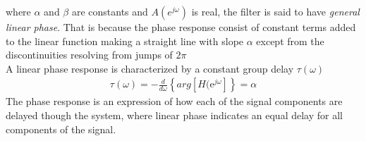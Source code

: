 where $\alpha$ and $\beta$ are constants and $A(e^{j\omega})$ is real, the filter is said to have \textit{general linear phase}. That is because the phase response consist of constant terms added to the linear function making a straight line with slope $\alpha$ except from the discontinuities resolving from jumps of $2\pi$ \\
A linear phase response is characterized by a constant group delay $\tau(\omega)$
\begin{align}
\tau(\omega)=-\frac{d}{d\omega}\left\{ arg \left[ H(\text{e}^{j\omega}\right] \right\} = \alpha
\end{align}
The phase response is an expression of how each of the signal components are delayed though the system, where linear phase indicates an equal delay for all components of the signal.  

